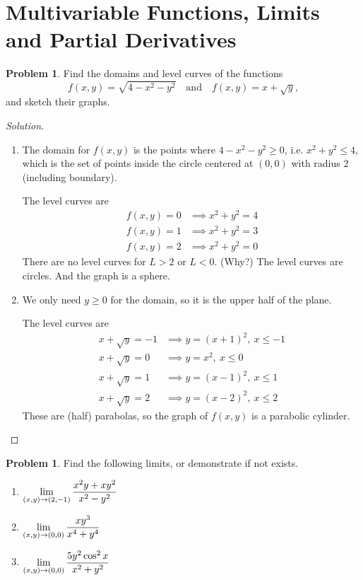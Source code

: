 \documentclass[12pt]{amsart}%
\theoremstyle{plain}
\theoremstyle{definition}
\newtheorem{prob}[theorem]{Problem}
\theoremstyle{special}
\newcommand{\sol}[1]{
{\begin{proof}[Solution]#1\end{proof}}
}
\newcommand{\Prob}[1]{\begin{tcolorbox}%
\begin{prob}
	#1
\end{prob}
\end{tcolorbox}	
}
\begin{document}
\section{Multivariable Functions, Limits and Partial Derivatives}
\Prob{Find the domains and level curves of the functions \[f(x,y)=\sqrt{4-x^2-y^2}\quad\text{and}\quad f(x,y)=x+\sqrt{y},\]
and sketch their graphs.
}
\sol{\hfill
\begin{enumerate}
	\item The domain for $f(x,y)$ is the points where $4-x^2-y^2\geq 0$, i.e. $x^2+y^2\leq 4$, which is the set of points inside the circle centered at $(0,0)$ with radius $2$ (including boundary).
	
	The level curves are
	\begin{align*}
	f(x,y)=0&\implies x^2+y^2=4\\
	f(x,y)=1&\implies x^2+y^2=3\\
	f(x,y)=2&\implies x^2+y^2=0	
	\end{align*}
	There are no level curves for $L>2$ or $L<0$. (Why?) The level curves are circles. And the graph is a sphere.

	\item We only need $y\geq 0$ for the domain, so it is the upper half of the plane.
	
	The level curves are%
	\begin{align*}
	x+\sqrt{y}=-1&\implies y=(x+1)^2,\ x\leq -1\\
		x+\sqrt{y}=0&\implies y=x^2,\ x\leq 0\\
		x+\sqrt{y}=1&\implies y=(x-1)^2,\ x\leq 1\\
		x+\sqrt{y}=2&\implies y=(x-2)^2,\ x\leq 2
	\end{align*}%
	These are (half) parabolas, so the graph of $f(x,y)$ is a parabolic cylinder.\qedhere

\end{enumerate}
}
\Prob{Find the following limits, or demonstrate if not exists.
\begin{enumerate}
\item 	
\(\displaystyle \lim_{(x,y)\to(2,-1) }{x^2y+xy^2\over x^2-y^2}\)\vspace{0.3cm}
\item \(\displaystyle \lim_{(x,y)\to (0,0)}{xy^3\over x^4+y^4}\vspace{0.3cm} 
\)
\item\(\displaystyle \lim_{(x,y)\to (0,0)} {5y^2\cos^2x\over x^2+y^2 } \)
\end{enumerate}
}
\end{document}
